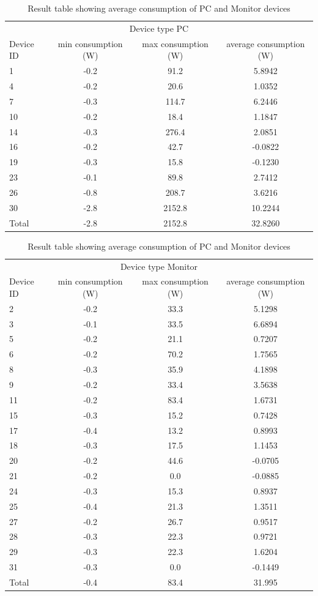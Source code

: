 \begin{table}[h]
	\centering
	\begin{tabular}{l|c|c|c}
		\multicolumn{4}{c}{Device type PC} \\
		Device ID & min consumption (W)& max consumption (W)& average consumption (W)\\
		1 & -0.2 & 91.2 & 5.8942\\
		4 & -0.2 & 20.6 & 1.0352 \\
		7 & -0.3 & 114.7 & 6.2446 \\
		10 & -0.2 & 18.4 & 1.1847 \\
		14 & -0.3 & 276.4 & 2.0851 \\
		16 & -0.2 & 42.7 & -0.0822 \\
		19 & -0.3 & 15.8 & -0.1230 \\
		23 & -0.1 & 89.8 & 2.7412 \\
		26 & -0.8 & 208.7 & 3.6216 \\
		30 & -2.8 & 2152.8 & 10.2244 \\
		\hline
		Total & -2.8 & 2152.8 & 32.8260 \\
	\end{tabular}
	
	\begin{tabular}{l|c|c|c}
		\multicolumn{4}{c}{Device type Monitor} \\
		Device ID & min consumption (W)& max consumption (W)& average consumption (W)\\
		2 & -0.2 & 33.3 & 5.1298 \\
		3 & -0.1 & 33.5 & 6.6894 \\
		5 & -0.2 & 21.1 & 0.7207 \\
		6 & -0.2 & 70.2 & 1.7565 \\
		8 & -0.3 & 35.9 & 4.1898 \\
		9 & -0.2 & 33.4 & 3.5638 \\
		11 & -0.2 & 83.4 & 1.6731 \\
		15 & -0.3 & 15.2 & 0.7428 \\
		17 & -0.4 & 13.2 & 0.8993 \\
		18 & -0.3 & 17.5 & 1.1453 \\
		20 & -0.2 & 44.6 & -0.0705 \\
		21 & -0.2 & 0.0 & -0.0885 \\
		24 & -0.3 & 15.3 & 0.8937 \\
		25 & -0.4 & 21.3 & 1.3511 \\
		27 & -0.2 & 26.7 & 0.9517 \\
		28 & -0.3 & 22.3 & 0.9721 \\
		29 & -0.3 & 22.3 & 1.6204 \\
		31 & -0.3 & 0.0 & -0.1449 \\
		\hline
		Total & -0.4 & 83.4 &31.995 \\
	\end{tabular}
	\caption{Result table showing average consumption of PC and Monitor devices}
	\label{tab:PCMon}
\end{table}
